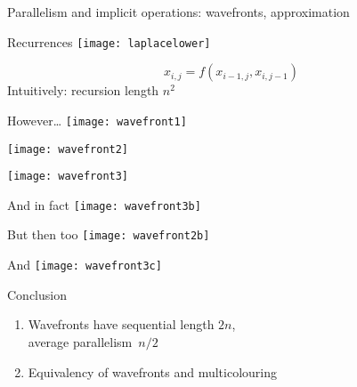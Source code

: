 
 {Parallelism and implicit operations: wavefronts, approximation}

\begin{frame}{Recurrences}
    \texttt{[image: laplacelower]}

    \[ x_{i,j} = f(x_{i-1,j},x_{i,j-1}) \]
    Intuitively: recursion length $n^2$
\end{frame}

\begin{frame}{However\ldots}
  \texttt{[image: wavefront1]}
\end{frame}

\begin{frame}
  \texttt{[image: wavefront2]}
\end{frame}

\begin{frame}
  \texttt{[image: wavefront3]}
\end{frame}

\begin{frame}{And in fact}
  \texttt{[image: wavefront3b]}
\end{frame}

\begin{frame}{But then too}
  \texttt{[image: wavefront2b]}
\end{frame}

\begin{frame}{And}
  \texttt{[image: wavefront3c]}
\end{frame}

\begin{frame}{Conclusion}
  \begin{enumerate}
  \item Wavefronts have sequential length $2n$,\\
    average parallelism~$n/2$
  \item Equivalency of wavefronts and multicolouring
  \end{enumerate}
\end{frame}

